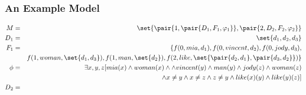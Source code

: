 \documentclass[a4paper]{article}
\theoremstyle{remark}
\theoremstyle{remark}
\theoremstyle{definition}
\theoremstyle{definition}
\begin{document}
\subsubsection{An Example Model} \label{sec:examplemodel}

\begin{eqnarray*}
  M &=& \set{\pair{1,\pair{D_1,F_1,\varphi_1}},\pair{2,D_2,F_2,\varphi_2}} \\
  D_1 &=& \set{d_1,d_2,d_3} \\
  F_1 &=& \{f(0,mia,d_1), f(0,vincent,d_2), f(0,jody,d_3),\\
  && f(1,woman,\set{ d_1,d_3 }), f(1,man,\set{ d_2 }),
  f(2,like,\set{\pair{d_2,d_1},\pair{d_3,d_2}})\} \\
  \phi &=& \exists x,y,z [mia(x)\wedge woman(x)\wedge \wedge vincent(y)\wedge
  man(y)\wedge jody(z)\wedge woman(z) \\&&\wedge x \neq y \wedge x\neq z \wedge z
  \neq y\wedge like(x)(y)\wedge like(y)(z)]\\
  D_2 &=& 
\end{eqnarray*}

\newpage


\end{document}
